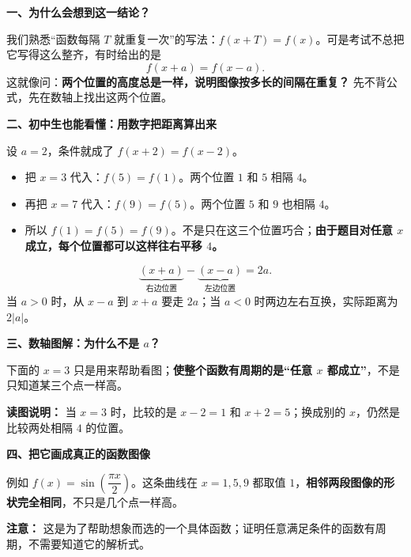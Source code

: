 \clearpage
\begin{explanationbox}
\textbf{\textcolor{CExplanation}{一、为什么会想到这一结论？}}



我们熟悉“函数每隔 $T$ 就重复一次”的写法：$f(x+T)=f(x)$。可是考试不总把它写得这么整齐，有时给出的是
\[
f(x+a)=f(x-a).
\]
这就像问：\textbf{两个位置的高度总是一样，说明图像按多长的间隔在重复？}
先不背公式，先在数轴上找出这两个位置。

\medskip

\end{explanationbox}
\clearpage
\begin{explanationbox}
\textbf{\textcolor{CExplanation}{二、初中生也能看懂：用数字把距离算出来}}



设 $a=2$，条件就成了 $f(x+2)=f(x-2)$。
\begin{itemize}[leftmargin=*,itemsep=0.3em]
\item 把 $x=3$ 代入：$f(5)=f(1)$。两个位置 $1$ 和 $5$ 相隔 $4$。
\item 再把 $x=7$ 代入：$f(9)=f(5)$。两个位置 $5$ 和 $9$ 也相隔 $4$。
\item 所以 $f(1)=f(5)=f(9)$。不是只在这三个位置巧合；\textbf{由于题目对任意 $x$ 成立，每个位置都可以这样往右平移 $4$。}
\end{itemize}

\[
\underbrace{(x+a)}_{\text{右边位置}}-\underbrace{(x-a)}_{\text{左边位置}}=2a.
\]
当 $a>0$ 时，从 $x-a$ 到 $x+a$ 要走 $2a$；当 $a<0$ 时两边左右互换，实际距离为 $2|a|$。

\medskip

\end{explanationbox}
\clearpage
\begin{explanationbox}
\textbf{\textcolor{CExplanation}{三、数轴图解：为什么不是 $a$？}}



下面的 $x=3$ 只是用来帮助看图；\textbf{使整个函数有周期的是“任意 $x$ 都成立”}，不是只知道某三个点一样高。


\textbf{读图说明：} 当 $x=3$ 时，比较的是 $x-2=1$ 和 $x+2=5$；换成别的 $x$，仍然是比较两处相隔 $4$ 的位置。

\medskip

\end{explanationbox}
\clearpage
\begin{explanationbox}
\textbf{\textcolor{CExplanation}{四、把它画成真正的函数图像}}



例如 $f(x)=\sin\!\left(\dfrac{\pi x}{2}\right)$。这条曲线在 $x=1,5,9$ 都取值 $1$，\textbf{相邻两段图像的形状完全相同}，不只是几个点一样高。


\textbf{注意：} 这是为了帮助想象而选的一个具体函数；证明任意满足条件的函数有周期，不需要知道它的解析式。

\medskip

\end{explanationbox}
